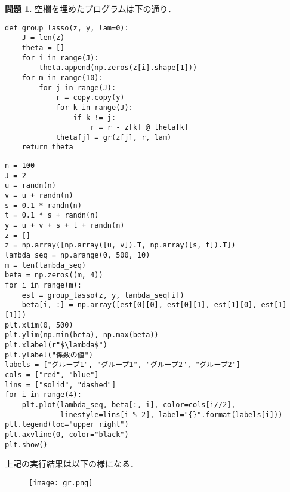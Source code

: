 \documentclass{jsarticle}
\theoremstyle{definition}
\newtheorem{Ex}{問題}
\theoremstyle{mystyle} %
\renewcommand{\footnotesize}{\normalsize}
\begin{document}
\begin{Ex}
  空欄を埋めたプログラムは下の通り．
  \begin{lstlisting}[basicstyle = \ttfamily\footnotesize, frame = single]
def group_lasso(z, y, lam=0):
    J = len(z)
    theta = []
    for i in range(J):
        theta.append(np.zeros(z[i].shape[1]))
    for m in range(10):
        for j in range(J):
            r = copy.copy(y)
            for k in range(J):
                if k != j:
                    r = r - z[k] @ theta[k]
            theta[j] = gr(z[j], r, lam)
    return theta
  \end{lstlisting}

  \begin{lstlisting}[basicstyle = \ttfamily\footnotesize, frame = single]
n = 100
J = 2
u = randn(n)
v = u + randn(n)
s = 0.1 * randn(n)
t = 0.1 * s + randn(n)
y = u + v + s + t + randn(n)
z = []
z = np.array([np.array([u, v]).T, np.array([s, t]).T])
lambda_seq = np.arange(0, 500, 10)
m = len(lambda_seq)
beta = np.zeros((m, 4))
for i in range(m):
    est = group_lasso(z, y, lambda_seq[i])
    beta[i, :] = np.array([est[0][0], est[0][1], est[1][0], est[1][1]])
plt.xlim(0, 500)
plt.ylim(np.min(beta), np.max(beta))
plt.xlabel(r"$\lambda$")
plt.ylabel("係数の値")
labels = ["グループ1", "グループ1", "グループ2", "グループ2"]
cols = ["red", "blue"]
lins = ["solid", "dashed"]
for i in range(4):
    plt.plot(lambda_seq, beta[:, i], color=cols[i//2],
             linestyle=lins[i % 2], label="{}".format(labels[i]))
plt.legend(loc="upper right")
plt.axvline(0, color="black")
plt.show()
    \end{lstlisting}
上記の実行結果は以下の様になる．
\begin{figure}[H]
\texttt{[image: gr.png]}
\end{figure}
\end{Ex}
\end{document}
